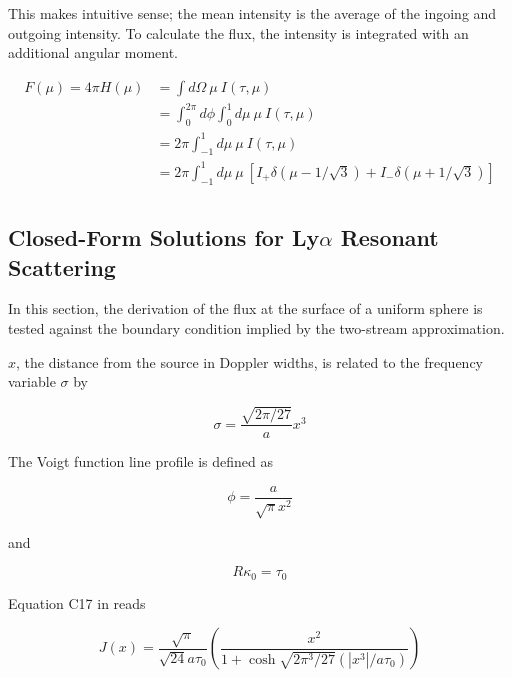 \documentclass[onecolumn]{aastex63}
\begin{document}
This makes intuitive sense; the mean intensity is the average of the ingoing and outgoing intensity. To calculate the flux, the intensity is integrated with an additional angular moment.


\begin{equation}
    \begin{split}
        F(\mu) = 4\pi H(\mu) &= \int d\Omega\ \mu\ I(\tau, \mu)\\
        &= \int_0^{2\pi} d\phi \int_0^1 d\mu\ \mu\ I(\tau, \mu)\\
        &= 2\pi \int_{-1}^1 d\mu\ \mu\ I(\tau, \mu)\\
        &= 2\pi \int_{-1}^1 d\mu\ \mu\ \left[I_+ \delta(\mu - 1/\sqrt{3}) + I_- \delta(\mu + 1/\sqrt{3})\right]\\
    \end{split}
\end{equation}

\subsection{Closed-Form Solutions for Ly$\alpha$ Resonant Scattering}

In this section, the derivation of the flux at the surface of a uniform sphere is tested against the boundary condition implied by the two-stream approximation.

$x$, the distance from the source in Doppler widths, is related to the frequency variable $\sigma$ by 

\begin{equation} \label{sigma}
    \sigma = \frac{\sqrt{2\pi/27}}{a} x^3
\end{equation}

The Voigt function line profile is defined as 

\begin{equation} \label{lineprofile}
    \phi = \frac{a}{\sqrt{\pi} x^2}
\end{equation}

and

\begin{equation} \label{tau}
    R\kappa_0 = \tau_0
\end{equation}

Equation C17 in \citet{2006ApJ...649...14D} reads

\begin{equation} \label{dijkstra}
    J(x) = \frac{\sqrt{\pi}}{\sqrt{24}a\tau_0}\left(\frac{x^2}{1 + \cosh{\sqrt{2\pi^3/27}(|x^3|/a\tau_0)}}\right)
\end{equation}
\end{document}
